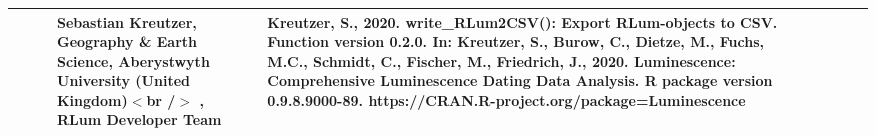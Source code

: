 \begin{table}[ht]
\begin{tabular}{rllllllll}
 &  &  & Sebastian Kreutzer, Geography \& Earth Science, Aberystwyth University (United Kingdom)$<$br /$>$ , RLum Developer Team & Kreutzer, S., 2020. write\_RLum2CSV(): Export RLum-objects to CSV. Function version 0.2.0. In: Kreutzer, S., Burow, C., Dietze, M., Fuchs, M.C., Schmidt, C., Fischer, M., Friedrich, J., 2020. Luminescence: Comprehensive Luminescence Dating Data Analysis. R package version 0.9.8.9000-89. https://CRAN.R-project.org/package=Luminescence
 \\ 
   \hline
\end{tabular}
\end{table}

